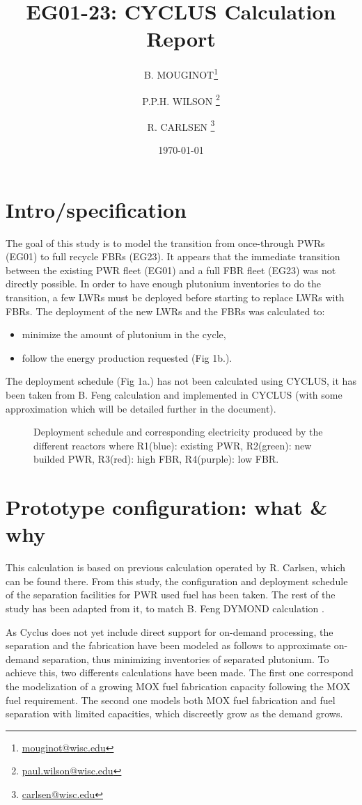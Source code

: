 \documentclass[12pt]{article}
\title{EG01-23: CYCLUS Calculation Report}
\author[1]{B. MOUGINOT\thanks{\href{mailto:mouginot@wisc.edu}{mouginot@wisc.edu}}}
\author[1]{P.P.H. WILSON \thanks{\href{mailto:paul.wilson@wisc.edu}{paul.wilson@wisc.edu}}}
\author[1]{R. CARLSEN \thanks{\href{mailto:carlsen@wisc.edu}{carlsen@wisc.edu}}}
\affil[1]{University of Wisconsin-Madison, Department of Engineering Physics, CNERG group}
\date{\today}
\begin{document}
\maketitle

\section{Intro/specification}
The goal of this study is to model the transition from once-through PWRs (EG01) to full recycle FBRs (EG23). It appears that the immediate transition between the existing PWR fleet (EG01) and a full FBR fleet (EG23) was not directly possible. In order to have enough plutonium inventories to do the transition, a few LWRs must be deployed before starting to replace LWRs with FBRs. The deployment of the new LWRs and the FBRs was calculated to:
\begin{itemize}
\item minimize the amount of plutonium in the cycle,
\item follow the energy production requested (Fig 1b.).
\end{itemize}
The deployment schedule (Fig 1a.) has not been calculated using CYCLUS, it has been taken from B. Feng calculation and implemented in CYCLUS (with some approximation which will be detailed further in the document).

\begin{figure}[h!]
\centering
{}
\caption{Deployment schedule and corresponding electricity produced by the different reactors where
R1(blue): existing PWR, R2(green): new builded PWR, R3(red): high FBR, R4(purple): low FBR.\label{fig:deployment} }
\end{figure}


\pagebreak
\section{Prototype configuration: what \& why}
This calculation is based on previous calculation operated by R. Carlsen, which can be found there. From this study, the configuration and deployment schedule of the separation facilities for PWR used fuel has been taken. The rest of the study has been adapted from it, to match B. Feng DYMOND calculation \cite{B.Feng_calculation}.

As Cyclus does not yet include direct support for on-demand processing, the separation and the fabrication have been modeled as follows to approximate on-demand separation, thus minimizing inventories of separated plutonium.
To achieve this, two differents calculations have been made. The first one correspond the modelization of a growing MOX fuel fabrication capacity following the MOX fuel requirement. The second one models both MOX fuel fabrication and fuel separation with limited capacities, which discreetly grow as the demand grows.
\end{document}
